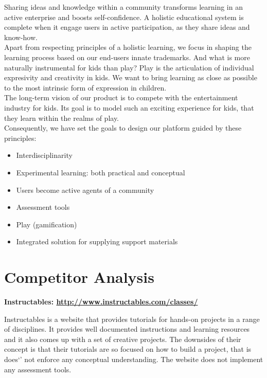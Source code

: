 Sharing ideas and knowledge within a community transforms learning in an active enterprise and boosts self-confidence. A holistic educational system is complete when it engage users in active participation, as they share ideas and know-how.\\

Apart from respecting principles of a holistic learning, we focus in shaping the learning process based on our end-users innate trademarks. And what is more naturally instrumental for kids than play? Play is the articulation of individual expresivity and creativity in kids. We want to bring learning as close as possible to the most intrinsic form of expression in children.\\ 

The long-term vision of our product is to compete with the entertainment industry for kids. Its goal is to model such an exciting experience for kids, that they learn within the realms of play.\\

Consequently, we have set the goals to design our platform guided by these principles:
\begin{itemize}
\item Interdisciplinarity
\item Experimental learning: both practical and conceptual
\item Users become active agents of a community 
\item Assessment tools
\item Play (gamification)
\item Integrated solution for supplying support materials 
\end{itemize}

\section{Competitor Analysis}

\textbf{Instructables: \url{http://www.instructables.com/classes/}}

Instructables is a website that provides tutorials for hands-on projects in a range of disciplines. It provides well documented instructions and learning resources and it also comes up with a set of creative projects.
The downsides of their concept is that their tutorials are so focused on how to build a project, that is does`' not enforce any conceptual understanding. The website does not implement any assessment tools.\\


